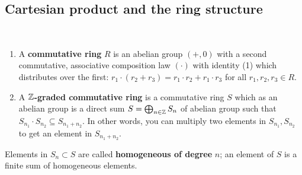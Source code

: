 \subsection{Cartesian product and the ring structure}
\begin{definition}[]
    \ \vspace{-0.2em} 
    \begin{enumerate}[label=(\roman*)]
    \setlength\itemsep{-.2em}
\item A \textbf{commutative ring} $R$ is an abelian group $(+,0)$ with a second commutative, associative composition law $(\cdot )$ with identity (1) which distributes over the first: $r_1\cdot (r_2+r_3)=r_1\cdot r_2+r_1\cdot r_3$ for all $r_1,r_2,r_3 \in R$.
\item A $\mathbb{Z}$\textbf{-graded commutative ring} is a commutative ring $S$ which as an abelian group is a direct sum $S=\bigoplus_{n \in \mathbb{Z}}S_n $ of abelian group such that $S_{n_1 }\cdot S_{n_2} \subseteq S_{n_1+n_2}$. In other words, you can multiply two elements in $S_{n_1},S_{n_2}$ to get an element in $S_{n_1+n_2}$.
    \end{enumerate}
    Elements in $S_n \subset S $ are called \textbf{homogeneous of degree} $n$; an element of $S$ is a finite sum of homogeneous elements.
\end{definition}


